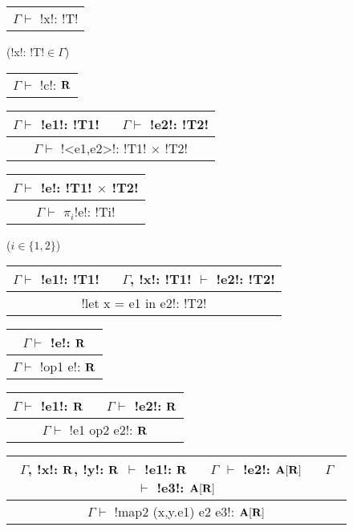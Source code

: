 \begin{figure*}[tb]
    \centering
    \begin{tabular}{c} 
    \\\hline
    $\Gamma \vdash$ !x!: !T!
    \end{tabular}(!x!: !T!$\in\Gamma$)
    \hspace{0.5cm}
    \begin{tabular}{c} 
        \\\hline
        $\Gamma \vdash$ !c!: $\mathbf{R}$
    \end{tabular}
    \hspace{0.5cm}
    \begin{tabular}{c}
    $\Gamma \vdash$ !e1!: !T1! $\quad$ $\Gamma \vdash$ !e2!: !T2! \\\hline  
    $\Gamma \vdash$ !<e1,e2>!: !T1! $\times$ !T2!
    \end{tabular}
    \hspace{0.5cm}
    \begin{tabular}{c}
        $\Gamma \vdash$ !e!: !T1! $\times$ !T2! \\\hline  
        $\Gamma \vdash$ $\pi_i$!e!: !Ti!
    \end{tabular}($i\in\{1,2\}$)

    \begin{tabular}{c}
    $\Gamma \vdash$ !e1!: !T1! $\quad$ $\Gamma$, !x!: !T1! $\vdash$ !e2!: !T2! \\\hline
    !let x = e1 in e2!: !T2!
    \end{tabular}
    \hspace{0.5cm}
    \begin{tabular}{c}
        $\Gamma \vdash$ !e!: $\mathbf{R}$ \\\hline  
        $\Gamma \vdash$ !op1 e!: $\mathbf{R}$
    \end{tabular}
    \hspace{0.5cm}
    \begin{tabular}{c}
        $\Gamma \vdash$ !e1!: $\mathbf{R}$ $\quad$ $\Gamma \vdash$ !e2!: $\mathbf{R}$ \\\hline  
        $\Gamma \vdash$ !e1 op2 e2!: $\mathbf{R}$
        \end{tabular}
 
    \begin{tabular}{c}
        $\Gamma$, !x!: $\mathbf{R}$, !y!: $\mathbf{R}$ $\vdash$ !e1!: $\mathbf{R}$ 
        $\quad$ $\Gamma$ $\vdash$ !e2!: $\mathbf{A}[\mathbf{R}]$
        $\quad$ $\Gamma$ $\vdash$ !e3!: $\mathbf{A}[\mathbf{R}]$
        \\\hline  
        $\Gamma \vdash$ !map2 (x,y.e1) e2 e3!: $\mathbf{A}[\mathbf{R}]$
    \end{tabular}


\end{figure*}
